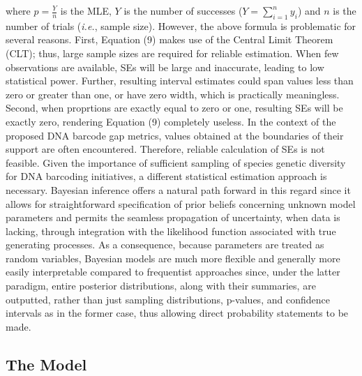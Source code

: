 \documentclass[12pt]{article}
\begin{document}
\noindent where $\hat{p} = \frac{Y}{n}$ is the MLE, $Y$ is the number of successes ($Y = \sum_{i=1}^n{y_i}$) and $n$ is the number of trials (\textit{i.e.}, sample size). However, the above formula is problematic for several reasons. First, Equation (9) makes use of the Central Limit Theorem (CLT); thus, large sample sizes are required for reliable estimation. When few observations are available, SEs will be large and inaccurate, leading to low statistical power. Further, resulting interval estimates could span values less than zero or greater than one, or have zero width, which is practically meaningless. Second, when proprtions are exactly equal to zero or one, resulting SEs will be exactly zero, rendering Equation (9) completely useless. In the context of the proposed DNA barcode gap metrics, values obtained at the boundaries of their support are often encountered. Therefore, reliable calculation of SEs is not feasible. Given the importance of sufficient sampling of species genetic diversity for DNA barcoding initiatives, a different statistical estimation approach is necessary. Bayesian inference offers a natural path forward in this regard since it allows for straightforward specification of prior beliefs concerning unknown model parameters and permits the seamless propagation of uncertainty, when data is lacking, through integration with the likelihood function associated with true generating processes. As a consequence, because parameters are treated as random variables, Bayesian models are much more flexible and generally more easily interpretable compared to frequentist approaches since, under the latter paradigm, entire posterior distributions, along with their summaries, are outputted, rather than just sampling distributions, p-values, and confidence intervals as in the former case, thus allowing direct probability statements to be made. 

\subsection{The Model}
\end{document}

